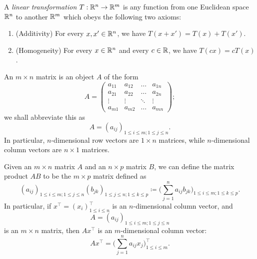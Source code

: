 \begin{defn}\label{ii:6.1.6}
  A \emph{linear transformation} \(T : \mathbb{R}^n \to \mathbb{R}^m\) is any function from one Euclidean space \(\mathbb{R}^n\) to another \(\mathbb{R}^m\) which obeys the following two axioms:
  \begin{enumerate}
    \item (Additivity)
          For every \(x, x' \in \mathbb{R}^n\), we have \(T(x + x') = T(x) + T(x')\).
    \item (Homogeneity)
          For every \(x \in \mathbb{R}^n\) and every \(c \in \mathbb{R}\), we have \(T(cx) = cT(x)\).
  \end{enumerate}
\end{defn}

\setcounter{thm}{9}
\begin{defn}[Matrices]\label{ii:6.1.10}
  An \(m \times n\) matrix is an object \(A\) of the form
  \[
    A = \begin{pmatrix}
      a_{11} & a_{12} & \dots  & a_{1n} \\
      a_{21} & a_{22} & \dots  & a_{2n} \\
      \vdots & \vdots & \ddots & \vdots \\
      a_{m1} & a_{m2} & \dots  & a_{mn}
    \end{pmatrix};
  \]
  we shall abbreviate this as
  \[
    A = (a_{ij})_{1 \leq i \leq m ; 1 \leq j \leq n}.
  \]
  In particular, \(n\)-dimensional row vectors are \(1 \times n\) matrices, while \(n\)-dimensional column vectors are \(n \times 1\) matrices.
\end{defn}

\begin{defn}\label{ii:6.1.11}
  Given an \(m \times n\) matrix \(A\) and an \(n \times p\) matrix \(B\), we can define the matrix product \(AB\) to be the \(m \times p\) matrix defined as
  \[
    (a_{ij})_{1 \leq i \leq m ; 1 \leq j \leq n} (b_{jk})_{1 \leq j \leq n ; 1 \leq k \leq p} \coloneqq \bigg(\sum_{j = 1}^n a_{ij} b_{jk}\bigg)_{1 \leq i \leq m ; 1 \leq k \leq p}.
  \]
  In particular, if \(x^\top = (x_i)_{1 \leq i \leq n}^\top\) is an \(n\)-dimensional column vector, and
  \[
    A = (a_{ij})_{1 \leq i \leq m ; 1 \leq j \leq n}
  \]
  is an \(m \times n\) matrix, then \(A x^\top\) is an \(m\)-dimensional column vector:
  \[
    A x^\top = \bigg(\sum_{j = 1}^n a_{ij} x_j\bigg)_{1 \leq i \leq m}^\top.
  \]
\end{defn}

